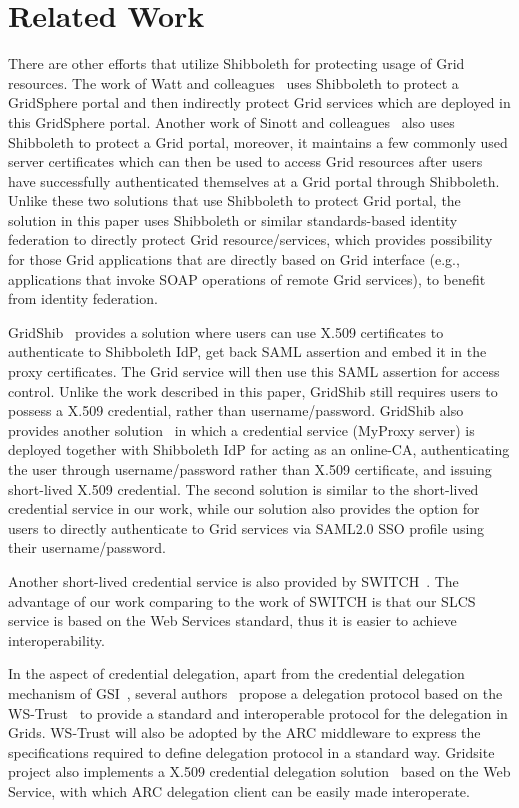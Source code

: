 \documentclass[conference]{IEEEtran}
\begin{document}
\section{Related Work}
\label{sec:relatedwork}

There are other efforts that utilize Shibboleth for protecting usage of Grid
resources. The work of Watt and colleagues~\cite{J.Watt06} uses Shibboleth to protect a GridSphere portal and
then indirectly protect Grid services which are deployed in this GridSphere portal.
Another work of Sinott and colleagues~\cite{R.O.Sinnott06} also uses Shibboleth to protect a Grid portal,
moreover, it maintains a few commonly used server certificates which can then be used to access
Grid resources after users have successfully authenticated themselves at a Grid portal
through Shibboleth. Unlike these two solutions that use Shibboleth to protect Grid
portal, the solution in this paper uses Shibboleth or similar standards-based identity federation to
directly protect Grid resource/services, which provides possibility for those Grid applications
that are directly based on Grid interface (e.g., applications that invoke SOAP operations of
remote Grid services), to benefit from identity federation.

GridShib~\cite{T.Scavo07,VWelch05} provides a solution where users can use
X.509 certificates to authenticate to Shibboleth IdP, get back SAML assertion and embed
it in the proxy certificates. The Grid service will then use this SAML assertion for
access control. Unlike the work described in this paper, GridShib still requires users to
possess a X.509 credential, rather than username/password. GridShib also provides another 
solution~\cite{TBarton06} in which a credential service (MyProxy server) is
deployed together with Shibboleth IdP for acting as an online-CA, authenticating the user through
username/password rather than X.509 certificate, and issuing short-lived X.509 credential. The
second solution is similar to the short-lived credential service in our work, while our
solution also provides the option for users to directly authenticate to Grid services via
SAML2.0 SSO profile using their username/password.

Another short-lived credential service is also provided by SWITCH~\cite{switchslcslink}. 
The advantage of our work comparing to the work of SWITCH is that 
our SLCS service is based on the Web Services standard, thus it is easier to
achieve interoperability.

In the aspect of credential delegation, apart from the credential delegation
mechanism of GSI~\cite{IFoster98,VWelch04}, several authors~\cite{MAhsant04} propose a
delegation protocol based on the WS-Trust~\cite{WSTrustlink} to provide a standard and interoperable
protocol for the delegation in Grids. WS-Trust will also be adopted by the ARC middleware
to express the specifications required to define delegation protocol in a standard way.
Gridsite project also implements a X.509 credential delegation solution~\cite{GridSitelink} based on
the Web Service, with which ARC delegation client can be easily made interoperate.
\end{document}
